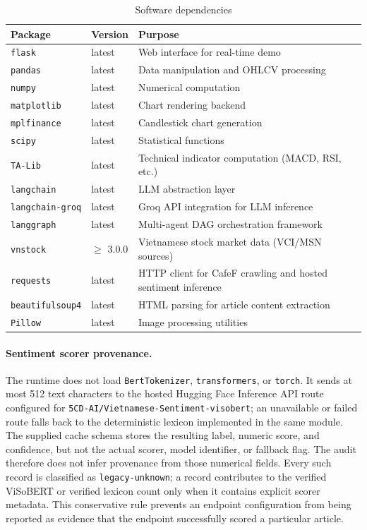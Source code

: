 \begin{table}[htb]
\centering
\caption{Software dependencies}
\label{tab:dependencies}
\renewcommand{\arraystretch}{1.15}

\begin{tabularx}{\textwidth}{|l|l|X|}
\hline
\textbf{Package} & \textbf{Version} & \textbf{Purpose} \\
\hline
\texttt{flask} & latest & Web interface for real-time demo \\
\hline
\texttt{pandas} & latest & Data manipulation and OHLCV processing \\
\hline
\texttt{numpy} & latest & Numerical computation \\
\hline
\texttt{matplotlib} & latest & Chart rendering backend \\
\hline
\texttt{mplfinance} & latest & Candlestick chart generation \\
\hline
\texttt{scipy} & latest & Statistical functions \\
\hline
\texttt{TA-Lib} & latest & Technical indicator computation (MACD, RSI, etc.) \\
\hline
\texttt{langchain} & latest & LLM abstraction layer \\
\hline
\texttt{langchain-groq} & latest & Groq API integration for LLM inference \\
\hline
\texttt{langgraph} & latest & Multi-agent DAG orchestration framework \\
\hline
\texttt{vnstock} & $\geq$ 3.0.0 & Vietnamese stock market data (VCI/MSN sources) \\
\hline
\texttt{requests} & latest & HTTP client for CafeF crawling and hosted sentiment inference \\
\hline
\texttt{beautifulsoup4} & latest & HTML parsing for article content extraction \\
\hline
\texttt{Pillow} & latest & Image processing utilities \\
\hline
\end{tabularx}
\end{table}

\paragraph{Sentiment scorer provenance.}
The runtime does not load \texttt{BertTokenizer}, \texttt{transformers}, or
\texttt{torch}. It sends at most 512 text characters to the hosted Hugging Face
Inference API route configured for
\texttt{5CD-AI/Vietnamese-Sentiment-visobert}; an unavailable or failed route
falls back to the deterministic lexicon implemented in the same module. The
supplied cache schema stores the resulting label, numeric score, and confidence,
but not the actual scorer, model identifier, or fallback flag. The audit therefore
does not infer provenance from those numerical fields. Every such record is
classified as \texttt{legacy-unknown}; a record contributes to the verified
ViSoBERT or verified lexicon count only when it contains explicit scorer metadata.
This conservative rule prevents an endpoint configuration from being reported as
evidence that the endpoint successfully scored a particular article.

